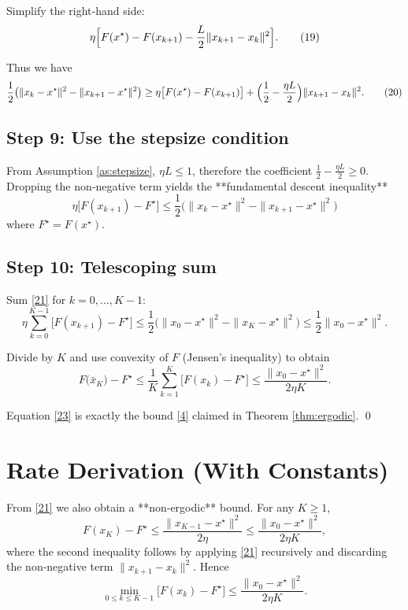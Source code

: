 \documentclass{article}
\begin{document}
Simplify the right‑hand side:
\[
\eta\Bigl[F(x^\star)-F(x_{k+1})-\frac{L}{2}\|x_{k+1}-x_k\|^{2}\Bigr].
\tag{19}
\]

Thus we have
\[
\frac{1}{2}\bigl(\|x_k-x^\star\|^{2}-\|x_{k+1}-x^\star\|^{2}\bigr)
\ge \eta\bigl[F(x^\star)-F(x_{k+1})\bigr]
+\Bigl(\frac{1}{2}-\frac{\eta L}{2}\Bigr)\|x_{k+1}-x_k\|^{2}.
\tag{20}
\]

\subsection*{Step 9: Use the stepsize condition}
From Assumption \ref{as:stepsize}, $\eta L\le1$, therefore the coefficient
$\frac{1}{2}-\frac{\eta L}{2}\ge0$.  Dropping the non‑negative term yields the **fundamental descent inequality**
\[
\boxed{\;
\eta\bigl[F(x_{k+1})-F^\star\bigr]
\le \frac{1}{2}\bigl(\|x_k-x^\star\|^{2}-\|x_{k+1}-x^\star\|^{2}\bigr)
\;}
\tag{21}
\]
where $F^\star=F(x^\star)$.

\subsection*{Step 10: Telescoping sum}
Sum \eqref{21} for $k=0,\dots,K-1$:
\[
\eta\sum_{k=0}^{K-1}\bigl[F(x_{k+1})-F^\star\bigr]
\le \frac{1}{2}\bigl(\|x_0-x^\star\|^{2}-\|x_{K}-x^\star\|^{2}\bigr)
\le \frac{1}{2}\|x_0-x^\star\|^{2}.
\tag{22}
\]

Divide by $K$ and use convexity of $F$ (Jensen’s inequality) to obtain
\[
F\bigl(\bar x_{K}\bigr)-F^\star
\le \frac{1}{K}\sum_{k=1}^{K}\bigl[F(x_{k})-F^\star\bigr]
\le \frac{\|x_0-x^\star\|^{2}}{2\eta K}.
\tag{23}
\]

Equation \eqref{23} is exactly the bound \eqref{4} claimed in Theorem \ref{thm:ergodic}.
\qed

\section*{Rate Derivation (With Constants)}
From \eqref{21} we also obtain a **non‑ergodic** bound.  For any $K\ge1$,
\[
F(x_{K})-F^\star
\le \frac{\|x_{K-1}-x^\star\|^{2}}{2\eta}
\le \frac{\|x_{0}-x^\star\|^{2}}{2\eta K},
\tag{24}
\]
where the second inequality follows by applying \eqref{21} recursively and discarding the non‑negative term $\|x_{k+1}-x_k\|^{2}$.  Hence
\[
\min_{0\le k\le K-1}\bigl[F(x_k)-F^\star\bigr]
\le \frac{\|x_{0}-x^\star\|^{2}}{2\eta K}.
\tag{25}
\]
\end{document}
